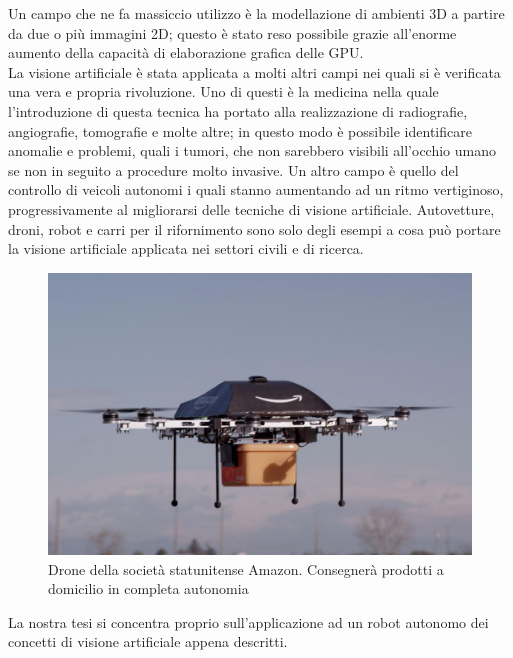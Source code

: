 Un campo che ne fa massiccio utilizzo è la modellazione di ambienti 3D a partire 
da due o più immagini 2D; questo è stato reso possibile 
grazie all'enorme aumento della capacità di elaborazione grafica delle GPU.\\
La visione artificiale è stata applicata a molti altri campi nei quali si è verificata 
una vera e propria rivoluzione.
Uno di questi è la medicina nella quale l'introduzione di questa tecnica ha portato
alla realizzazione di radiografie, angiografie,
tomografie e molte altre; in questo modo è possibile identificare anomalie e 
problemi, quali i tumori, che non sarebbero visibili all'occhio umano 
se non in seguito a procedure molto invasive.
Un altro campo è quello del controllo di veicoli autonomi i quali stanno aumentando
ad un ritmo vertiginoso, progressivamente al migliorarsi delle tecniche di 
visione artificiale. Autovetture, droni, robot e carri per il rifornimento 
sono solo degli esempi a cosa può portare la visione artificiale applicata nei settori 
civili e di ricerca.
\begin{figure}[!htb] \center
\includegraphics[scale=0.2]{immagini/amazon-air.png}
\caption{Drone della società statunitense Amazon. Consegnerà prodotti a domicilio in completa autonomia} 
\end{figure}
La nostra tesi si concentra proprio sull'applicazione ad un robot autonomo dei 
concetti di visione artificiale appena descritti.

